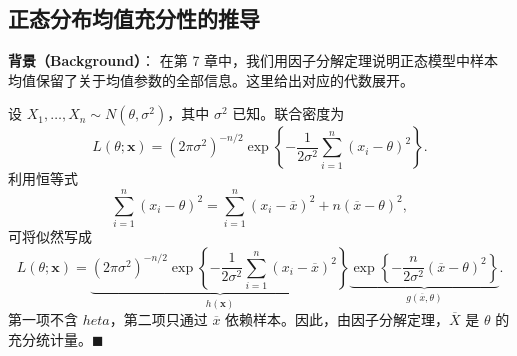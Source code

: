 \subsection{正态分布均值充分性的推导}\label{sec:appendix-ch7}

\textbf{背景（Background）}：
在第 7 章中，我们用因子分解定理说明正态模型中样本均值保留了关于均值参数的全部信息。这里给出对应的代数展开。

设 $X_1, \ldots, X_n \sim N(\theta, \sigma^2)$，其中 $\sigma^2$ 已知。联合密度为
\[
L(\theta;\mathbf{x}) = (2\pi\sigma^2)^{-n/2}\exp\left\{-\frac{1}{2\sigma^2}\sum_{i=1}^n (x_i-\theta)^2\right\}.
\]
利用恒等式
\[
\sum_{i=1}^n (x_i-\theta)^2
= \sum_{i=1}^n (x_i-\overline{x})^2 + n(\overline{x}-\theta)^2,
\]
可将似然写成
\[
L(\theta;\mathbf{x})
= \underbrace{(2\pi\sigma^2)^{-n/2}\exp\left\{-\frac{1}{2\sigma^2}\sum_{i=1}^n (x_i-\overline{x})^2\right\}}_{h(\mathbf{x})}
\underbrace{\exp\left\{-\frac{n}{2\sigma^2}(\overline{x}-\theta)^2\right\}}_{g(\overline{x},\theta)}.
\]
第一项不含 $	heta$，第二项只通过 $\overline{x}$ 依赖样本。因此，由因子分解定理，$\overline{X}$ 是 $\theta$ 的充分统计量。$\blacksquare$

